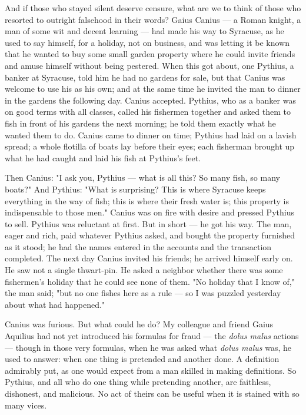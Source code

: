  And if those who stayed silent deserve censure, what are we to think of those who resorted to outright falsehood in their words? Gaius Canius — a Roman knight, a man of some wit and decent learning — had made his way to Syracuse, as he used to say himself, for a holiday, not on business, and was letting it be known that he wanted to buy some small garden property where he could invite friends and amuse himself without being pestered. When this got about, one Pythius, a banker at Syracuse, told him he had no gardens for sale, but that Canius was welcome to use his as his own; and at the same time he invited the man to dinner in the gardens the following day. Canius accepted. Pythius, who as a banker was on good terms with all classes, called his fishermen together and asked them to fish in front of his gardens the next morning; he told them exactly what he wanted them to do. Canius came to dinner on time; Pythius had laid on a lavish spread; a whole flotilla of boats lay before their eyes; each fisherman brought up what he had caught and laid his fish at Pythius's feet.

 Then Canius: "I ask you, Pythius — what is all this? So many fish, so many boats?" And Pythius: "What is surprising? This is where Syracuse keeps everything in the way of fish; this is where their fresh water is; this property is indispensable to those men." Canius was on fire with desire and pressed Pythius to sell. Pythius was reluctant at first. But in short — he got his way. The man, eager and rich, paid whatever Pythius asked, and bought the property furnished as it stood; he had the names entered in the accounts and the transaction completed. The next day Canius invited his friends; he arrived himself early on. He saw not a single thwart-pin. He asked a neighbor whether there was some fishermen's holiday that he could see none of them. "No holiday that I know of," the man said; "but no one fishes here as a rule — so I was puzzled yesterday about what had happened."

 Canius was furious. But what could he do? My colleague and friend Gaius Aquilius had not yet introduced his formulas for fraud — the \textit{dolus malus} actions — though in those very formulas, when he was asked what \textit{dolus malus} was, he used to answer: when one thing is pretended and another done. A definition admirably put, as one would expect from a man skilled in making definitions. So Pythius, and all who do one thing while pretending another, are faithless, dishonest, and malicious. No act of theirs can be useful when it is stained with so many vices.

